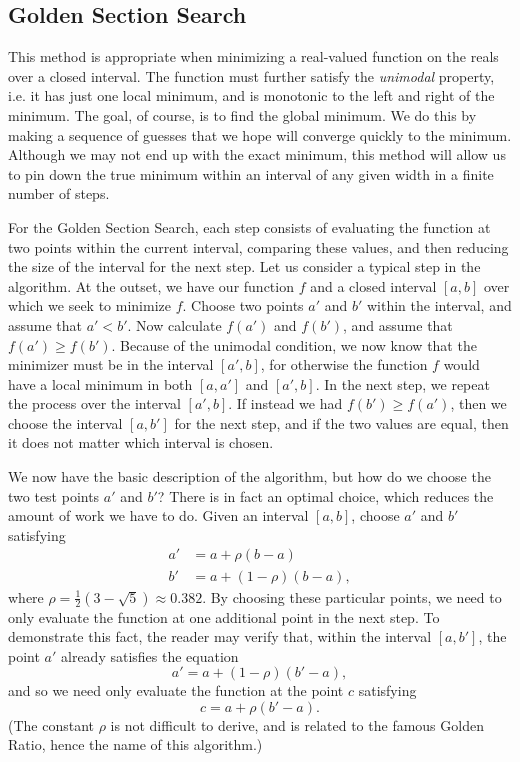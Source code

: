 \subsection*{Golden Section Search}
This method is appropriate when minimizing a real-valued function on the reals over a closed interval.
The function must further satisfy the \emph{unimodal} property, i.e. it has just one local minimum, and is monotonic to the left and right of the minimum.
The goal, of course, is to find the global minimum.
We do this by making a sequence of guesses that we hope will converge quickly to the minimum.
Although we may not end up with the exact minimum, this method will allow us to pin down the true minimum within an interval of any given width in a finite number of steps.

For the Golden Section Search, each step consists of evaluating the function at two points within the current interval, comparing these values, and then reducing the size of the interval for the next step.
Let us consider a typical step in the algorithm.
At the outset, we have our function $f$ and a closed interval $[a, b]$ over which we seek to minimize $f$.
Choose two points $a'$ and $b'$ within the interval, and assume that $a' < b'$.
Now calculate $f(a')$ and $f(b')$, and assume that $f(a') \geq f(b')$.
Because of the unimodal condition, we now know that the minimizer must be in the interval $[a', b]$, for otherwise the function $f$ would have a local minimum in both $[a, a']$ and $[a', b]$.
In the next step, we repeat the process over the interval $[a', b]$.
If instead we had $f(b') \geq f(a')$, then we choose the interval $[a, b']$ for the next step, and if the two values are equal, then it does not matter which interval is chosen.

We now have the basic description of the algorithm, but how do we choose the two test points $a'$ and $b'$? There is in fact an optimal choice, which reduces the amount of work we have to do.
Given an interval $[a, b]$, choose $a'$ and $b'$ satisfying
\begin{align*}
a' &= a + \rho(b - a) \\
b' &= a + (1 - \rho)(b - a),
\end{align*}
where $\rho = \frac{1}{2}(3 - \sqrt{5}) \approx 0.382$.
By choosing these particular points, we need to only evaluate the function at one additional point in the next step.
To demonstrate this fact, the reader may verify that, within the interval $[a, b']$, the point $a'$ already satisfies the equation
\begin{equation*}
a' = a + (1 - \rho)(b' - a),
\end{equation*}
and so we need only evaluate the function at the point $c$ satisfying
\begin{equation*}
c = a + \rho(b' - a).
\end{equation*}
(The constant $\rho$ is not difficult to derive, and is related to the famous Golden Ratio, hence the name of this algorithm.)


